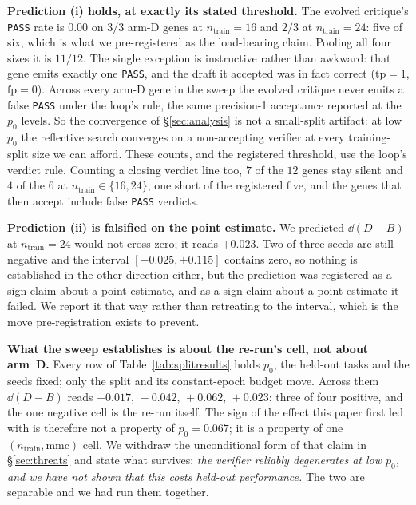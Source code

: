 \documentclass[11pt]{article}
\begin{document}
\textbf{Prediction (i) holds, at exactly its stated threshold.} The evolved critique's
\texttt{PASS} rate is $0.00$ on $3/3$ arm-D genes at $n_{\mathrm{train}}{=}16$ and $2/3$ at
$n_{\mathrm{train}}{=}24$: five of six, which is what we pre-registered as the load-bearing
claim. Pooling all four sizes it is $11/12$. The single exception is instructive rather than
awkward: that gene emits exactly one \texttt{PASS}, and the draft it accepted was in fact
correct ($\mathrm{tp}{=}1$, $\mathrm{fp}{=}0$). Across every arm-D gene in the sweep the
evolved critique never emits a false \texttt{PASS} under the loop's rule, the same precision-1
acceptance reported at the $p_0$ levels. So the convergence of \S\ref{sec:analysis} is not a
small-split artifact: at low $p_0$ the reflective search converges on a non-accepting verifier
at every training-split size we can afford. These counts, and the registered threshold, use the
loop's verdict rule. Counting a closing verdict line too, $7$ of the $12$ genes stay silent and
$4$ of the $6$ at $n_{\mathrm{train}} \in \{16, 24\}$, one short of the registered five, and the
genes that then accept include false \texttt{PASS} verdicts.

\textbf{Prediction (ii) is falsified on the point estimate.} We predicted $\dd(D-B)$ at
$n_{\mathrm{train}}{=}24$ would not cross zero; it reads $+0.023$. Two of three seeds are still
negative and the interval $[-0.025,+0.115]$ contains zero, so nothing is established in the
other direction either, but the prediction was registered as a sign claim about a point
estimate, and as a sign claim about a point estimate it failed. We report it that way rather
than retreating to the interval, which is the move pre-registration exists to prevent.

\textbf{What the sweep establishes is about the re-run's cell, not about arm~D.} Every row of
Table~\ref{tab:splitresults} holds $p_0$, the held-out tasks and the seeds fixed; only the
split and its constant-epoch budget move. Across them $\dd(D-B)$ reads
$+0.017,\,-0.042,\,+0.062,\,+0.023$: three of four positive, and the one negative cell is
the re-run itself. The sign of the effect this paper first led with is therefore not a property of
$p_0 = 0.067$; it is a property of one $(n_{\mathrm{train}}, \mathrm{mmc})$ cell. We withdraw
the unconditional form of that claim in \S\ref{sec:threats} and state what survives:
\emph{the verifier reliably degenerates at low $p_0$, and we have not shown that this costs
held-out performance.} The two are separable and we had run them together.
\end{document}
